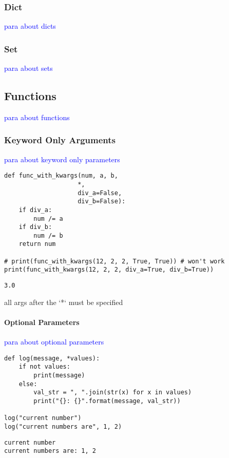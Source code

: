 \subsubsection{Dict}

\textcolor{blue}{para about dicts}

\subsubsection{Set}

\textcolor{blue}{para about sets}

\subsection{Functions}

\textcolor{blue}{para about functions}

\subsubsection{Keyword Only Arguments}

\textcolor{blue}{para about keyword only parameters}

\begin{lstlisting}[style=pyInStyle]
def func_with_kwargs(num, a, b,
                    *,
                    div_a=False,
                    div_b=False):
    if div_a:
        num /= a
    if div_b:
        num /= b
    return num

# print(func_with_kwargs(12, 2, 2, True, True)) # won't work
print(func_with_kwargs(12, 2, 2, div_a=True, div_b=True))
\end{lstlisting}
\begin{lstlisting}[style=pyOutStyle]
3.0
\end{lstlisting}
\begin{markdown}
all args after the `*` must be specified
\end{markdown}


\paragraph{Optional Parameters}

\textcolor{blue}{para about optional parameters}

\begin{lstlisting}[style=pyInStyle]
def log(message, *values):
    if not values:
        print(message)
    else:
        val_str = ", ".join(str(x) for x in values)
        print("{}: {}".format(message, val_str))

log("current number")
log("current numbers are", 1, 2)
\end{lstlisting}
\begin{lstlisting}[style=pyOutStyle]
current number
current numbers are: 1, 2
\end{lstlisting}

